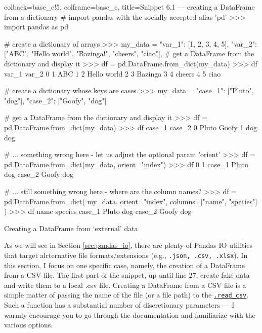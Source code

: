 \documentclass[a4paper,11pt]{book}
\numberwithin{figure}{chapter}
\numberwithin{table}{chapter}
\newcommand{\question}[1]{%
    \begin{tcolorbox}[colback=comp_c!10,colframe=comp_c,sidebyside align=top,width=\linewidth,before skip=1ex]
        #1
    \end{tcolorbox}
    \switchcolumn%
}
\newcommand{\note}[1]{%
    \begin{tcolorbox}[colback=white!0,colframe=white!10,width=\linewidth,before skip=1ex]
        #1
    \end{tcolorbox}
}
\begin{document}
\begin{pythoncode}[linenos=true,]{colback=base_c!5, colframe=base_c, title=\sffamily Snippet 6.1 --- creating a DataFrame from a dictionary}
# import pandas with the socially accepted alias 'pd'
>>> import pandas as pd

# create a dictionary of arrays
>>> my_data = {
        "var_1": [1, 2, 3, 4, 5],
        "var_2": ["ABC", "Hello world", "Bazinga!", "cheers", "ciao"],
    }
# get a DataFrame from the dictionary and display it
>>> df = pd.DataFrame.from_dict(my_data)
>>> df
   var_1        var_2
0      1          ABC
1      2  Hello world
2      3      Bazinga
3      4       cheers
4      5         ciao

# create a dictionary whose keys are cases 
>>> my_data = {"case_1": ["Pluto", "dog"], "case_2": ["Goofy", "dog"]}


# get a DataFrame from the dictionary and display it
>>> df = pd.DataFrame.from_dict(my_data)
>>> df
   case_1   case_2
0   Pluto    Goofy
1     dog      dog

# ... something wrong here - let us adjust the optional param 'orient'
>>> df = pd.DataFrame.from_dict(my_data, orient="index")
>>> df
            0       1
case_1  Pluto     dog
case_2  Goofy     dog

# ... still something wrong here - where are the column names?
>>> df = pd.DataFrame.from_dict(
	my_data, orient="index",
	columns=["name", "species"]
	)
>>> df
         name  species
case_1  Pluto      dog
case_2  Goofy      dog

\end{pythoncode}

\begin{paracol}{2}
	\question{\raggedright Creating a DataFrame from `external' data}
	\note{As we will see in Section \ref{sec:pandas_io}, there are plenty of Pandas IO utilities that target alrternative file formats/extensions (e.g., \texttt{.json, .csv, .xlsx}). In this section, I focus on one specific case, namely, the creation of a DataFrame from a CSV file. The first part of the snippet, up until line 27, create fake data and write them to a local .csv file. Creating a DataFrame from a CSV file is a simple matter of passing the name of the file (or a file path) to the \href{https://pandas.pydata.org/docs/reference/api/pandas.read_csv.html?highlight=read_csv#pandas.read_csv}{\texttt{.read\_csv}}. Such a function has a substantial number of discretionary parameters --- I warmly encourage you to go through the documentation and familiarize with the various options.}
\end{paracol}
\end{document}
